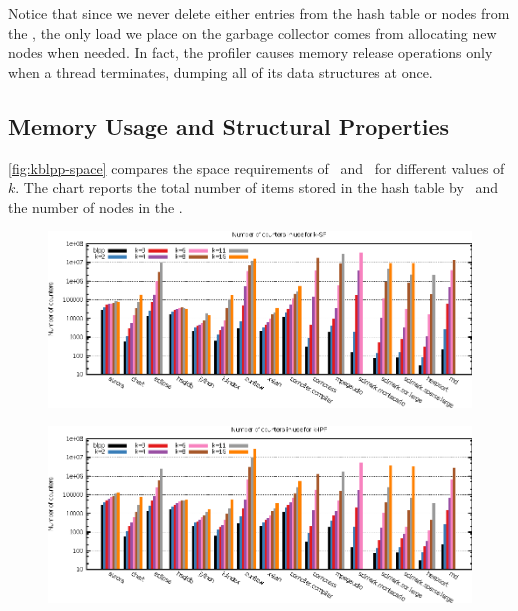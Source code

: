 \noindent Notice that since we never delete either entries from the hash table or nodes from the \ksf, the only load we place on the garbage collector comes from allocating new nodes when needed. In fact, the profiler causes memory release operations only when a thread terminates, dumping all of its data structures at once.

\subsection{Memory Usage and Structural Properties}
\myfigure\ref{fig:kblpp-space} compares the space requirements of \blpp\ and \kblpp\ for different values of $k$. The chart reports the total number of items stored in the hash table by \blpp\ and the number of nodes in the \ksf.

\ifdefined\noauthorea
\begin{figure}[!ht]
\begin{center}
\includegraphics[width=\textwidth]{figures/kblpp-space/kblpp-space.eps}
\caption{\protect}
\end{center}
\end{figure}
\fi

\vspace{-1em}

\ifdefined\noauthorea
\begin{figure}[!ht]
\begin{center}
\includegraphics[width=\textwidth]{figures/kblpp-space-kipf/kblpp-space-kipf.eps}
\caption{\protect}
\end{center}
\end{figure}
\fi

